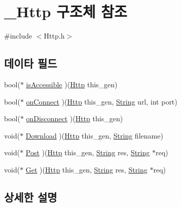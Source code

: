 \hypertarget{struct___http}{\section{\-\_\-\-Http 구조체 참조}
\label{struct___http}
}


{\ttfamily \#include $<$Http.\-h$>$}

\subsection*{데이타 필드}
\begin{DoxyCompactItemize}
\item 
bool($\ast$ \hyperlink{struct___http_a3f21ba58588b0d2e11e7611caf3fa65c}{is\-Accessible} )(\hyperlink{_http_8h_ab22f08c745d656245f8d98e3d095c584}{Http} this\-\_\-gen)
\item 
bool($\ast$ \hyperlink{struct___http_a952cc07a3505431bf33a7a6393a1503a}{on\-Connect} )(\hyperlink{_http_8h_ab22f08c745d656245f8d98e3d095c584}{Http} this\-\_\-gen, \hyperlink{dit_8h_a2efe6d463d80744789f228f5dc4baa39}{String} url, int port)
\item 
bool($\ast$ \hyperlink{struct___http_ad6d1f6047ef195fe434e3d259aa0375a}{on\-Disconnect} )(\hyperlink{_http_8h_ab22f08c745d656245f8d98e3d095c584}{Http} this\-\_\-gen)
\item 
void($\ast$ \hyperlink{struct___http_a5c2263401d4e2ad7e91fa5189b2a60e1}{Download} )(\hyperlink{_http_8h_ab22f08c745d656245f8d98e3d095c584}{Http} this\-\_\-gen, \hyperlink{dit_8h_a2efe6d463d80744789f228f5dc4baa39}{String} filename)
\item 
void($\ast$ \hyperlink{struct___http_a451c690a3b05c1c9ee2af0cc6903b9d7}{Post} )(\hyperlink{_http_8h_ab22f08c745d656245f8d98e3d095c584}{Http} this\-\_\-gen, \hyperlink{dit_8h_a2efe6d463d80744789f228f5dc4baa39}{String} res, \hyperlink{dit_8h_a2efe6d463d80744789f228f5dc4baa39}{String} $\ast$req)
\item 
void($\ast$ \hyperlink{struct___http_a7d476aeddf2c20ee482845959c71446b}{Get} )(\hyperlink{_http_8h_ab22f08c745d656245f8d98e3d095c584}{Http} this\-\_\-gen, \hyperlink{dit_8h_a2efe6d463d80744789f228f5dc4baa39}{String} res, \hyperlink{dit_8h_a2efe6d463d80744789f228f5dc4baa39}{String} $\ast$req)
\end{DoxyCompactItemize}


\subsection{상세한 설명}



